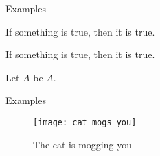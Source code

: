 \begin{frame}{Examples}
  \begin{theorem}
    If something is true, then it is true.
  \end{theorem}

  \begin{lemma}
    If something is true, then it is true.
  \end{lemma}
  
  \begin{definition}
    Let \(A\) be \(A\).
  \end{definition}
\end{frame}

\begin{frame}{Examples}
  \begin{figure}
    \begin{center}
      \texttt{[image: cat\_mogs\_you]}
    \end{center}
    \caption{The cat is mogging you}
  \end{figure}
\end{frame}
